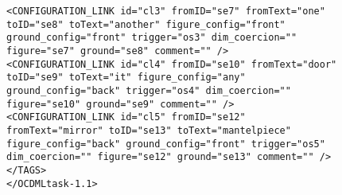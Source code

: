 \documentclass[11pt]{article}
\begin{document}
\begin{appendix}
\begin{figure}
\begin{verbatim}
<CONFIGURATION_LINK id="cl3" fromID="se7" fromText="one" toID="se8" toText="another" figure_config="front" ground_config="front" trigger="os3" dim_coercion="" figure="se7" ground="se8" comment="" />
<CONFIGURATION_LINK id="cl4" fromID="se10" fromText="door" toID="se9" toText="it" figure_config="any" ground_config="back" trigger="os4" dim_coercion="" figure="se10" ground="se9" comment="" />
<CONFIGURATION_LINK id="cl5" fromID="se12" fromText="mirror" toID="se13" toText="mantelpiece" figure_config="back" ground_config="front" trigger="os5" dim_coercion="" figure="se12" ground="se13" comment="" />
</TAGS>
</OCDMLtask-1.1>
        \end{verbatim}
    \end{figure}
\end{appendix}
\end{document}
